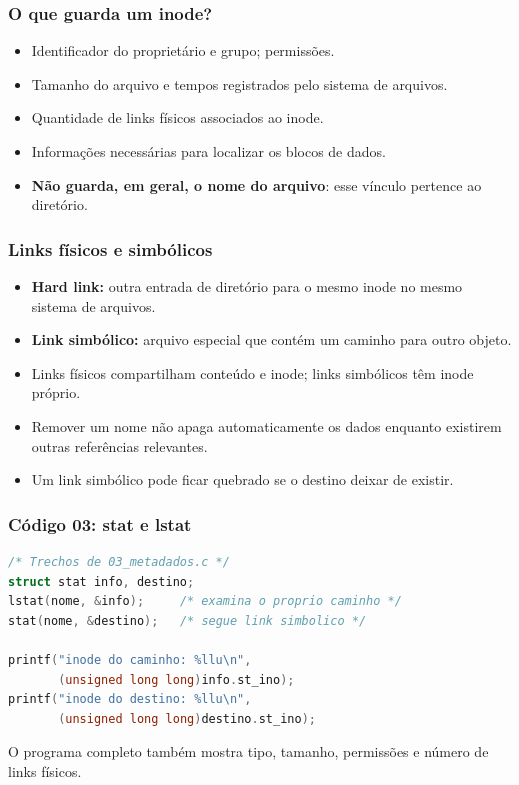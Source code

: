 \documentclass[aspectratio=169,11pt]{beamer}
\begin{document}
\begin{frame}
\frametitle{O que guarda um inode?}
\large
\begin{itemize}
\item Identificador do proprietário e grupo; permissões.
\item Tamanho do arquivo e tempos registrados pelo sistema de arquivos.
\item Quantidade de links físicos associados ao inode.
\item Informações necessárias para localizar os blocos de dados.
\item \textbf{Não guarda, em geral, o nome do arquivo}: esse vínculo pertence ao diretório.
\end{itemize}

\end{frame}

\begin{frame}
\frametitle{Links físicos e simbólicos}
\large
\begin{itemize}
\item \textbf{Hard link:} outra entrada de diretório para o mesmo inode no mesmo sistema de arquivos.
\item \textbf{Link simbólico:} arquivo especial que contém um caminho para outro objeto.
\item Links físicos compartilham conteúdo e inode; links simbólicos têm inode próprio.
\item Remover um nome não apaga automaticamente os dados enquanto existirem outras referências relevantes.
\item Um link simbólico pode ficar quebrado se o destino deixar de existir.
\end{itemize}

\end{frame}

\begin{frame}[fragile]
\frametitle{Código 03: stat e lstat}
\begin{lstlisting}[language=C]
/* Trechos de 03_metadados.c */
struct stat info, destino;
lstat(nome, &info);     /* examina o proprio caminho */
stat(nome, &destino);   /* segue link simbolico */

printf("inode do caminho: %llu\n",
       (unsigned long long)info.st_ino);
printf("inode do destino: %llu\n",
       (unsigned long long)destino.st_ino);
\end{lstlisting}
\vfill\small\textcolor{dkblue}{O programa completo também mostra tipo, tamanho, permissões e número de links físicos.}

\end{frame}
\end{document}
